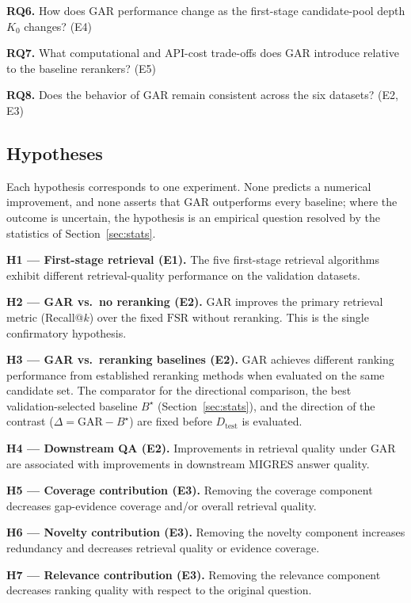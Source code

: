 \documentclass[11pt,a4paper]{article}
\begin{document}
\textbf{RQ6.} How does GAR performance change as the first-stage candidate-pool depth $K_0$ changes? \hfill (E4)

\textbf{RQ7.} What computational and API-cost trade-offs does GAR introduce relative to the baseline rerankers? \hfill (E5)

\textbf{RQ8.} Does the behavior of GAR remain consistent across the six datasets? \hfill (E2, E3)

\subsection{Hypotheses}
\label{sec:hyp}

Each hypothesis corresponds to one experiment. None predicts a numerical improvement, and none asserts that GAR outperforms every baseline; where the outcome is uncertain, the hypothesis is an empirical question resolved by the statistics of Section~\ref{sec:stats}.

\textbf{H1 --- First-stage retrieval (E1).} The five first-stage retrieval algorithms exhibit different retrieval-quality performance on the validation datasets.

\textbf{H2 --- GAR vs.\ no reranking (E2).} GAR improves the primary retrieval metric (Recall@$k$) over the fixed $\mathrm{FSR}$ without reranking. This is the single confirmatory hypothesis.

\textbf{H3 --- GAR vs.\ reranking baselines (E2).} GAR achieves different ranking performance from established reranking methods when evaluated on the same candidate set. The comparator for the directional comparison, the best validation-selected baseline $B^\star$ (Section~\ref{sec:stats}), and the direction of the contrast ($\Delta=\text{GAR}-B^\star$) are fixed before $D_{\mathrm{test}}$ is evaluated.

\textbf{H4 --- Downstream QA (E2).} Improvements in retrieval quality under GAR are associated with improvements in downstream MIGRES answer quality.

\textbf{H5 --- Coverage contribution (E3).} Removing the coverage component decreases gap-evidence coverage and/or overall retrieval quality.

\textbf{H6 --- Novelty contribution (E3).} Removing the novelty component increases redundancy and decreases retrieval quality or evidence coverage.

\textbf{H7 --- Relevance contribution (E3).} Removing the relevance component decreases ranking quality with respect to the original question.
\end{document}
